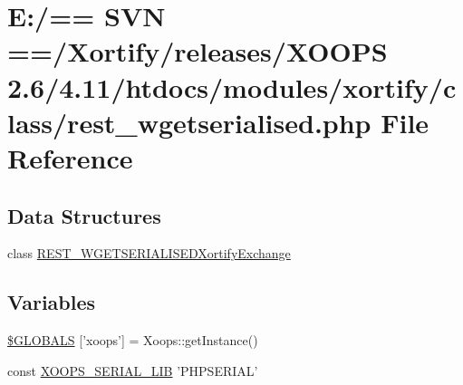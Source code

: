 \hypertarget{rest__wgetserialised_8php}{\section{E\-:/== S\-V\-N ==/\-Xortify/releases/\-X\-O\-O\-P\-S 2.6/4.11/htdocs/modules/xortify/class/rest\-\_\-wgetserialised.php File Reference}
\label{rest__wgetserialised_8php}
}
\subsection*{Data Structures}
\begin{DoxyCompactItemize}
\item 
class \hyperlink{class_r_e_s_t___w_g_e_t_s_e_r_i_a_l_i_s_e_d_xortify_exchange}{R\-E\-S\-T\-\_\-\-W\-G\-E\-T\-S\-E\-R\-I\-A\-L\-I\-S\-E\-D\-Xortify\-Exchange}
\end{DoxyCompactItemize}
\subsection*{Variables}
\begin{DoxyCompactItemize}
\item 
\hyperlink{rest__wgetserialised_8php_ad10934112c0d18cf6b358d47afa6fcf1}{\$\-G\-L\-O\-B\-A\-L\-S} \mbox{[}'xoops'\mbox{]} = Xoops\-::get\-Instance()
\item 
const \hyperlink{rest__wgetserialised_8php_a70ad743fdbf705daf2366b5cabf7a04d}{X\-O\-O\-P\-S\-\_\-\-S\-E\-R\-I\-A\-L\-\_\-\-L\-I\-B} 'P\-H\-P\-S\-E\-R\-I\-A\-L'
\end{DoxyCompactItemize}


